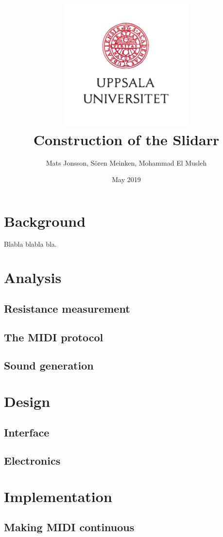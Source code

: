 \documentclass{article}
\title{\includegraphics[width=0.5\textwidth]{UU_logo.pdf}\\
Construction of the Slidarr}
\author{Mats Jonsson, Sören Meinken, Mohammad El Musleh}
\date{May 2019}
\begin{document}
\maketitle

\pagebreak

\tableofcontents

\pagebreak

\section{Background}
Blabla blabla bla.

\section{Analysis}

\subsection{Resistance measurement}

\subsection{The MIDI protocol}

\subsection{Sound generation}

\section{Design}

\subsection{Interface}

\subsection{Electronics}

\section{Implementation}

\subsection{Making MIDI continuous}
\end{document}
